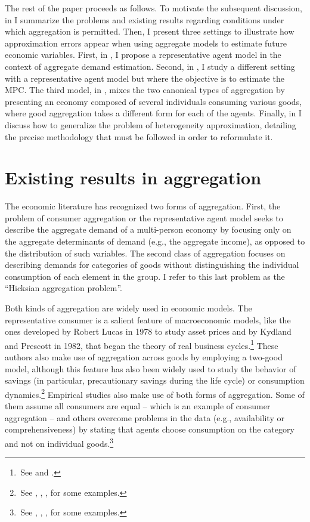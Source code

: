 \documentclass[english, a4paper, 12pt]{article}
\begin{document}
The rest of the paper proceeds as follows. To motivate the subsequent discussion, in  I summarize the problems and existing results regarding conditions under which aggregation is permitted. Then, I present three settings to illustrate how approximation errors appear when using aggregate models to estimate future economic variables. First, in , I propose a representative agent model in the context of aggregate demand estimation. Second, in , I study a different setting with a representative agent model but where the objective is to estimate the MPC. The third model, in , mixes the two canonical types of aggregation by presenting an economy composed of several individuals consuming various goods, where good aggregation takes a different form for each of the agents. Finally, in  I discuss how to generalize the problem of heterogeneity approximation, detailing the precise methodology that must be followed in order to reformulate it.

\section{Existing results in aggregation} \label{sec:PrevResults}
The economic literature has recognized two forms of aggregation. First, the problem of consumer aggregation or the representative agent model seeks to describe the aggregate demand of a multi-person economy by focusing only on the aggregate determinants of demand (e.g., the aggregate income), as opposed to the distribution of such variables. The second class of aggregation focuses on describing demands for categories of goods without distinguishing the individual consumption of each element in the group. I refer to this last problem as the ``Hicksian aggregation problem''.

Both kinds of aggregation are widely used in economic models. The representative consumer is a salient feature of macroeconomic models, like the ones developed by Robert Lucas in 1978 to study asset prices and by Kydland and Prescott in 1982, that began the theory of real business cycles.\footnote{\,See \cite{Lucas78} and \cite{KyPr82}.} These authors also make use of aggregation across goods by employing a two-good model, although this feature has also been widely used to study the behavior of savings (in particular, precautionary savings during the life cycle) or consumption dynamics.\footnote{\,See \cite{Carroll92}, \cite{GourinchasParker02}, \cite{GulPesendorfer04}, \cite{ParkerPreston05} for some examples.} Empirical studies also make use of both forms of aggregation. Some of them assume all consumers are equal -- which is an example of consumer aggregation -- and others overcome problems in the data (e.g., availability or comprehensiveness) by stating that agents choose consumption on the category and not on individual goods.\footnote{\,See \cite{KaplanViolante14}, \cite{BergerVavra15}, \cite{KanPengWang17}, \cite{FagerengGuisoPistaferri17} for some examples.}
\end{document}
